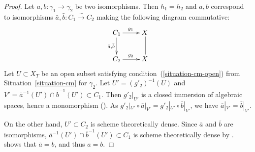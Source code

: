 \documentclass{stacks-project}
\theoremstyle{plain}
\theoremstyle{definition}
\theoremstyle{remark}
\numberwithin{equation}{subsection}
\begin{document}
\begin{proof}
Let $a,b \colon \gamma_1 \to \gamma_2$ be two isomorphisms.
Then $h_1 = h_2$ and $a,b$ correspond to isomorphisms $\bar{a},\bar{b} \colon C_1 \xrightarrow{\sim} C_2$ making the following diagram commutative:
\[ \xymatrix{
  C_1 \ar[r]^{g_1} \ar[d]_{\bar{a},\bar{b}} & X \ar@{=}[d] \\
C_2 \ar[r]^{g_2} & X
} \]
Let $U \subset X_T$ be an open subset satisfying condition~(\ref{situation-cm-open}) from Situation~\ref{situation-cm} for $\gamma_2$.
Let $U' = (g'_2)^{-1}(U)$ and $V' = \bar{a}^{-1}(U') \cap \bar{b}^{-1}(U') \subset C_1$.
Then $g'_2|_{U'}$ is a closed immersion of algebraic spaces, hence a monomorphism (\cite[Tag 042R]{stacks-project}).
As $g'_2|_{U'} \circ \bar{a}|_{V'} = g'_2|_{U'} \circ \bar{b}|_{V'}$, we have $\bar{a}|_{V'} = \bar{b}|_{V'}$.

On the other hand, $U' \subset C_2$ is scheme theoretically dense.
Since $\bar{a}$ and $\bar{b}$ are isomorphisms, $\bar{a}^{-1}(U') \cap \bar{b}^{-1}(U') \subset C_1$ is scheme theoretically dense by \cite[Tag 0837]{stacks-project}.
\cite[Tag 084N]{stacks-project} shows that $\bar{a} = \bar{b}$, and thus $a = b$.
\end{proof}
\end{document}
